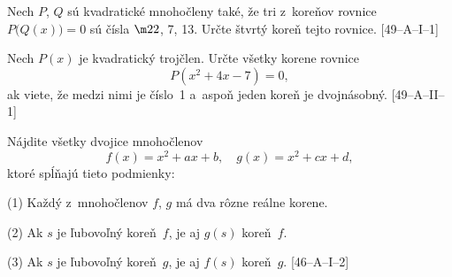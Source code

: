 {Nech $P$, $Q$ sú kvadratické mnohočleny také, že tri
z~koreňov rovnice $P\bigl(Q(x)\bigr)=0$ sú
čísla $\m22$, 7, 13. Určte štvrtý koreň tejto rovnice.
[49--A--I--1]

Nech $P(x)$ je kvadratický trojčlen. Určte všetky korene rovnice
$$
P(x^2+4x-7)=0,
$$
ak viete, že medzi nimi je číslo~1 a~aspoň jeden
koreň je dvojnásobný.
[49--A--II--1]

Nájdite všetky dvojice mnohočlenov
$$
f(x)=x^2+ax+b,\quad g(x)=x^2+cx+d,
$$
ktoré spĺňajú tieto podmienky:
\item{(1)} Každý z~mnohočlenov $f$, $g$ má dva rôzne reálne korene.
\item{(2)} Ak $s$ je ľubovoľný koreň~$f$, je aj $g(s)$ koreň~$f$.
\item{(3)} Ak $s$ je ľubovoľný koreň~$g$, je aj $f(s)$ koreň~$g$.
[46--A--I--2]
}

